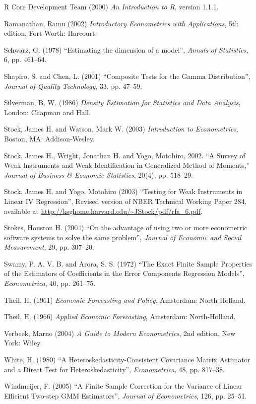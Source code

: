 \begin{thebibliography}
  R Core Development Team (2000) \emph{An Introduction to R}, version
  1.1.1.

  Ramanathan, Ramu (2002) \emph{Introductory Econometrics with
    Applications}, 5th edition, Fort Worth: Harcourt.
  
  Schwarz, G. (1978) ``Estimating the dimension of a model'',
  \textit{Annals of Statistics}, 6, pp. 461--64.
  
  Shapiro, S. and Chen, L. (2001) ``Composite Tests for the Gamma
  Distribution'', \emph{Journal of Quality Technology}, 33, pp.
  47--59.
    
  Silverman, B. W. (1986) \emph{Density Estimation for Statistics and
    Data Analysis}, London: Chapman and Hall.
  
  Stock, James H. and Watson, Mark W. (2003) \emph{Introduction to
    Econometrics}, Boston, MA: Addison-Wesley.

  Stock, James H., Wright, Jonathan H. and Yogo, Motohiro, 2002. ``A
  Survey of Weak Instruments and Weak Identification in Generalized
  Method of Moments,'' \emph{Journal of Business \& Economic
    Statistics}, 20(4), pp. 518--29.

  Stock, James H. and Yogo, Motohiro (2003) ``Testing for Weak
  Instruments in Linear IV Regression'', Revised version of 
  NBER Technical Working Paper 284, available at
  \url{http://ksghome.harvard.edu/~JStock/pdf/rfa_6.pdf}.

  Stokes, Houston H. (2004) ``On the advantage of using two or more
  econometric software systems to solve the same problem'',
  \emph{Journal of Economic and Social Measurement}, 29, pp. 307--20.

  Swamy, P. A. V. B. and Arora, S. S. (1972) ``The Exact Finite Sample
  Properties of the Estimators of Coefficients in the Error Components
  Regression Models'', \emph{Econometrica}, 40, pp. 261--75.  

  Theil, H. (1961) \emph{Economic Forecasting and Policy}, Amsterdam:
  North-Holland.

  Theil, H. (1966) \emph{Applied Economic Forecasting}, Amsterdam:
  North-Holland.

  Verbeek, Marno (2004) \emph{A Guide to Modern Econometrics}, 2nd
  edition, New York: Wiley.

  White, H. (1980) ``A Heteroskedasticity-Consistent Covariance Matrix
  Astimator and a Direct Test for Heteroskedasticity'',
  \emph{Econometrica}, 48, pp. 817--38.

  Windmeijer, F. (2005) ``A Finite Sample Correction for the Variance
  of Linear Efficient Two-step GMM Estimators'', \emph{Journal of
    Econometrics}, 126, pp. 25--51.
  

\end{thebibliography}
